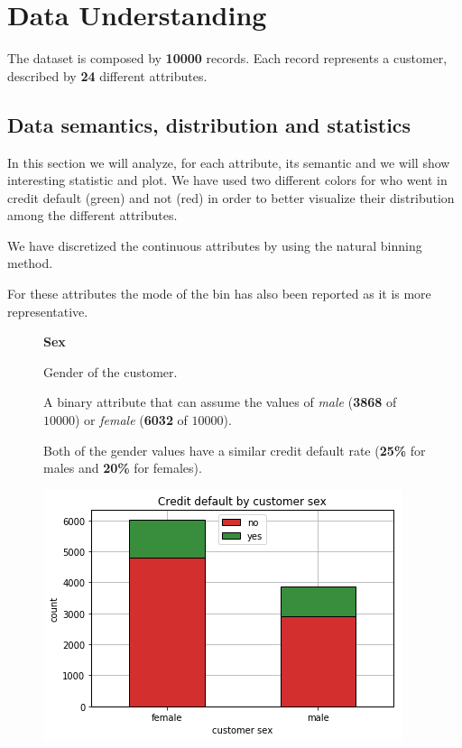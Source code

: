 \chapter{Data Understanding}

The dataset is composed by \textbf{10000} records. Each record represents a customer, described by \textbf{24} different attributes.

\medskip

\section{Data semantics, distribution and statistics}

In this section we will analyze, for each attribute, its semantic and we will show interesting statistic and plot.
We have used two different colors for who went in credit default (green) and not (red) in order to better visualize their distribution among the different attributes.

We have discretized the continuous attributes by using the natural binning method. 

For these attributes the mode of the bin has also been reported as it is more representative.

\smallskip
\begin{figure}[h]
  \begin{minipage}[h]{.50\textwidth}
        {\Large \textbf{Sex}}
        
        Gender of the customer.
        
        A binary attribute that can assume the values of \textit{male} (\textbf{3868} of $10000$) or \textit{female} (\textbf{6032} of $10000$). 
        
        Both of the gender values have a similar credit default rate (\textbf{25\%} for males and \textbf{20\%} for females).
  \end{minipage}
  \begin{minipage}[h]{.50\textwidth}
    \includegraphics[width=.95\textwidth]{img/ch2/sex}
  \end{minipage}
\end{figure}

